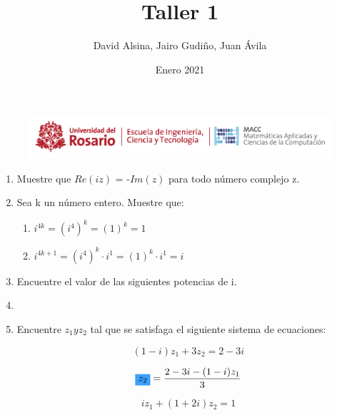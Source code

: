 \documentclass[a4paper,12pt]{article}
\title{Taller 1}
\author{David Alsina, Jairo Gudiño, Juan Ávila}
\date{Enero 2021}
\begin{document}
    \begin{figure}[ht]
         \centering
		 \includegraphics[width = \linewidth]{./header.png}
         \maketitle
    \end{figure}

    \begin{enumerate}
        \item Muestre que $Re(iz)$ = -$Im(z)$ para todo número complejo z.
        
        \item Sea k un número entero. Muestre que:
            
            \begin{enumerate}
                \item $i^{4k} = (i^{4})^{k} = (1)^{k} = 1$
                \item $i^{4k + 1} = (i^{4})^{k} \cdot i^{1} = (1)^{k} \cdot i^{1} = i$
            \end{enumerate}
        
        \item Encuentre el valor de las siguientes potencias de i.
        
                \item 

        \item Encuentre $z_{1} y z_{2}$ tal que se satisfaga el siguiente sistema de ecuaciones:

            \begin{equation}
                (1 - i)z_{1} + 3z_{2} = 2 - 3i  
            \end{equation}
                
            \begin{eqnarray*}
                \colorbox{blueMacc}{$z_{2}$} = \frac{2 - 3i - (1 - i)z_{1}}{3}
            \end{eqnarray*}

            \begin{equation}
                iz_{1} + (1 + 2i)z_{2} = 1 
            \end{equation}
            

\end{enumerate}
\end{document}
